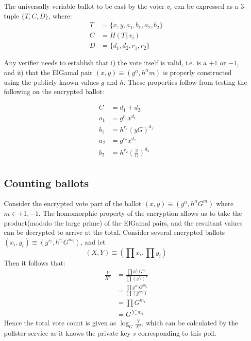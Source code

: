 The universally veriable ballot to be cast by the voter $v_i$
can be expressed as a 3-tuple $\{T,C,D\}$, where:
\begin{equation} \label{eq3}
\begin{split}
T & = \{ x, y, a_1, b_1, a_2, b_2 \} \\
C & = H( T || v_i ) \\    %
D & = \{d_1, d_2, r_1, r_2 \} 
\end{split}
\end{equation}

Any verifier needs to establish that i)
the vote itself is valid, i.e. is a $+1$ or $-1$, and ii) that the ElGamal
pair $(x,y) \equiv (g^\alpha, h^\alpha m)$ is properly constructed using the
publicly known values $g$ and $h$.  These properties follow from testing
the following on the encrypted ballot:

\begin{equation} \label{eq4}
\begin{split}
C & = d_1 + d_2  \\
a_1 & = g^{r_1} x^{d_1}  \\
b_1 & = h^{r_1} (yG)^{d_1} \\
a_2 & = g^{r_2} x^{d_2} \\
b_2 & = h^{r_2}(\frac{y}{G})^{d_2} \\
\end{split}
\end{equation}


\subsection{Counting ballots}

Consider the encrypted vote part of the ballot $(x,y) \equiv (g^\alpha, h^\alpha G^m)$
where $m \in {+1, -1}$.
The homomorphic property of the encryption allows us to take the product(modulo
the large prime) of the ElGamal pairs, and the resultant values can be decrypted to
arrive at the total.   Consider several encrypted ballots
$(x_i,y_i) \equiv (g^{r_i} , h^{r_i} G^{m_i})$, and let 
\[
(X,Y) \equiv (\prod x_i , \prod y_i) 
\]
Then it follows that:
\begin{equation} \label{eq5}
\begin{split}
  \frac{Y}{X^s} & = \frac{\prod h^{r_i} G^{m_i}}{ \prod (g^{r_i})^s } \\
  & =  \frac{\prod g^{sr_i} G^{m_i}}{ \prod (g^{sr_i}) } \\
  & = \prod G^{m_i} \\
   & = G^{\sum m_i}
\end{split}
\end{equation}
Hence the total vote count is given as $\log_G \frac{Y}{X^s}$, which can be
calculated by the pollster service as it knows the private key $s$ corresponding
to this poll.


